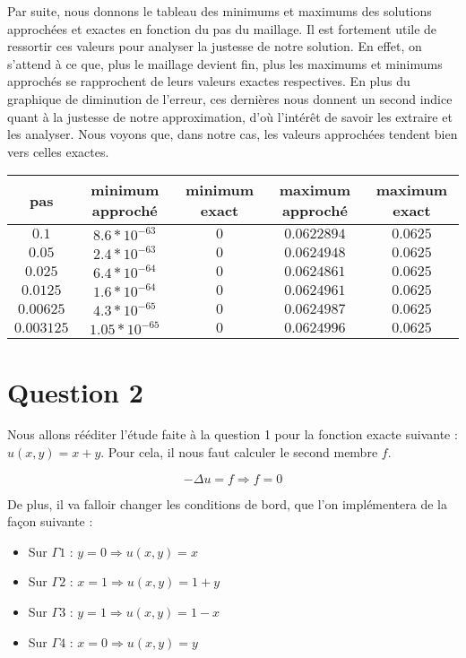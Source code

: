 \documentclass[11pt,a4paper]{report}
\begin{document}
			Par suite, nous donnons le tableau des minimums et maximums des solutions approchées et exactes en fonction du pas du maillage. Il est fortement utile de ressortir ces valeurs pour analyser la justesse de notre solution. En effet, on s'attend à ce que, plus le maillage devient fin, plus les maximums et minimums approchés se rapprochent de leurs valeurs exactes respectives. En plus du graphique de diminution de l'erreur, ces dernières nous donnent un second indice quant à la justesse de notre approximation, d'où l'intérêt de savoir les extraire et les analyser. Nous voyons que, dans notre cas, les valeurs approchées tendent bien vers celles exactes.		
		
			\begin{center}
				\begin{tabular}{|c|c|c|c|c|}
					\hline
					pas & minimum approché & minimum exact & maximum approché & maximum exact \\
					\hline 
					$0.1$ & $8.6*10^{-63}$ & $0$ & $0.0622894$ & $0.0625$\\ 
					\hline 
					$0.05$ & $2.4*10^{-63}$ & $0$ & $0.0624948$ & $0.0625$\\ 
					\hline 
					$0.025$ & $6.4*10^{-64}$ & $0$ & $0.0624861$ & $0.0625$  \\ 
					\hline 
					$0.0125$ & $1.6*10^{-64}$ & $0$ & $0.0624961$ & $0.0625$\\ 
					\hline 
					$0.00625$ & $4.3*10^{-65}$ & $0$ & $0.0624987$ & $0.0625$ \\ 
					\hline 
					$0.003125$ & $1.05*10^{-65}$ & $0$ & $0.0624996$ & $0.0625$ \\ 
					\hline 
				\end{tabular} 
			\end{center}
			
		
		\section*{Question 2}
		
			Nous allons rééditer l'étude faite à la question 1 pour la fonction exacte suivante : $ u(x,y) = x + y$. Pour cela, il nous faut calculer le second membre $f$. 
			
			\[
			- \Delta u = f \Longrightarrow f = 0 
			\]
			
			De plus, il va falloir changer les conditions de bord, que l'on implémentera de la façon suivante : 
			
			\begin{itemize}
				\item Sur $ \Gamma 1 $ : $ y = 0 \Longrightarrow u(x,y) = x$ 
				\item Sur $ \Gamma 2 $ : $ x = 1 \Longrightarrow u(x,y) = 1 + y $
				\item Sur $ \Gamma 3 $ : $ y = 1 \Longrightarrow u(x,y) = 1 - x$
				\item Sur $ \Gamma 4 $ : $ x = 0 \Longrightarrow u(x,y) = y$
				 
			\end{itemize}
			
\end{document}
